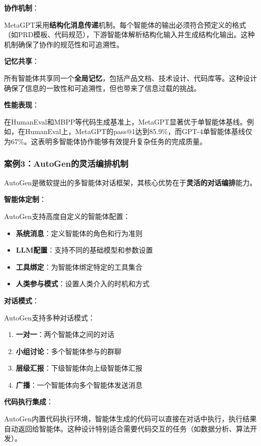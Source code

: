 \textbf{协作机制}：

MetaGPT采用\textbf{结构化消息传递}机制。每个智能体的输出必须符合预定义的格式（如PRD模板、代码规范），下游智能体解析结构化输入并生成结构化输出。这种机制确保了协作的规范性和可追溯性。

\textbf{记忆共享}：

所有智能体共享同一个\textbf{全局记忆}，包括产品文档、技术设计、代码库等。这种设计确保了信息的一致性和可追溯性，但也带来了信息过载的挑战。

\textbf{性能表现}：

在HumanEval和MBPP等代码生成基准上，MetaGPT显著优于单智能体基线。例如，在HumanEval上，MetaGPT的pass@1达到85.9\%，而GPT-4单智能体基线仅为67\%。这表明多智能体协作能够有效提升复杂任务的完成质量。

\subsubsection{案例3：AutoGen的灵活编排机制}

AutoGen是微软提出的多智能体对话框架，其核心优势在于\textbf{灵活的对话编排}能力。

\textbf{智能体定制}：

AutoGen支持高度自定义的智能体配置：
\begin{itemize}[leftmargin=2em]
    \item \textbf{系统消息}：定义智能体的角色和行为准则
    \item \textbf{LLM配置}：支持不同的基础模型和参数设置
    \item \textbf{工具绑定}：为智能体绑定特定的工具集合
    \item \textbf{人类参与模式}：设置人类介入的时机和方式
\end{itemize}

\textbf{对话模式}：

AutoGen支持多种对话模式：
\begin{enumerate}[leftmargin=2em]
    \item \textbf{一对一}：两个智能体之间的对话
    \item \textbf{小组讨论}：多个智能体参与的群聊
    \item \textbf{层级汇报}：下级智能体向上级智能体汇报
    \item \textbf{广播}：一个智能体向多个智能体发送消息
\end{enumerate}

\textbf{代码执行集成}：

AutoGen内置代码执行环境，智能体生成的代码可以直接在对话中执行，执行结果自动返回给智能体。这种设计特别适合需要代码交互的任务（如数据分析、算法开发）。
